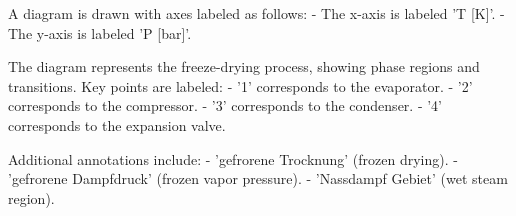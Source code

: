 A diagram is drawn with axes labeled as follows:  
- The x-axis is labeled 'T [K]'.  
- The y-axis is labeled 'P [bar]'.  

The diagram represents the freeze-drying process, showing phase regions and transitions. Key points are labeled:  
- '1' corresponds to the evaporator.  
- '2' corresponds to the compressor.  
- '3' corresponds to the condenser.  
- '4' corresponds to the expansion valve.  

Additional annotations include:  
- 'gefrorene Trocknung' (frozen drying).  
- 'gefrorene Dampfdruck' (frozen vapor pressure).  
- 'Nassdampf Gebiet' (wet steam region).